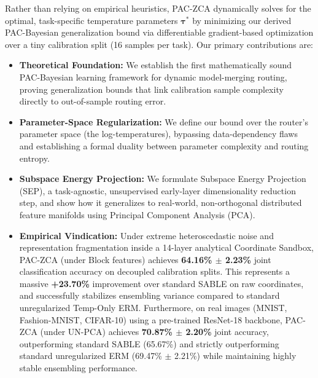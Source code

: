 Rather than relying on empirical heuristics, PAC-ZCA dynamically solves for the optimal, task-specific temperature parameters $\boldsymbol{\tau}^*$ by minimizing our derived PAC-Bayesian generalization bound via differentiable gradient-based optimization over a tiny calibration split (16 samples per task). Our primary contributions are:
\begin{itemize}
    \item \textbf{Theoretical Foundation:} We establish the first mathematically sound PAC-Bayesian learning framework for dynamic model-merging routing, proving generalization bounds that link calibration sample complexity directly to out-of-sample routing error.
    \item \textbf{Parameter-Space Regularization:} We define our bound over the router's parameter space (the log-temperatures), bypassing data-dependency flaws and establishing a formal duality between parameter complexity and routing entropy.
    \item \textbf{Subspace Energy Projection:} We formulate Subspace Energy Projection (SEP), a task-agnostic, unsupervised early-layer dimensionality reduction step, and show how it generalizes to real-world, non-orthogonal distributed feature manifolds using Principal Component Analysis (PCA).
    \item \textbf{Empirical Vindication:} Under extreme heteroscedastic noise and representation fragmentation inside a 14-layer analytical Coordinate Sandbox, PAC-ZCA (under Block features) achieves \textbf{64.16\% $\pm$ 2.23\%} joint classification accuracy on decoupled calibration splits. This represents a massive \textbf{+23.70\%} improvement over standard SABLE on raw coordinates, and successfully stabilizes ensembling variance compared to standard unregularized Temp-Only ERM. Furthermore, on real images (MNIST, Fashion-MNIST, CIFAR-10) using a pre-trained ResNet-18 backbone, PAC-ZCA (under UN-PCA) achieves \textbf{70.87\% $\pm$ 2.20\%} joint accuracy, outperforming standard SABLE (65.67\%) and strictly outperforming standard unregularized ERM (69.47\% $\pm$ 2.21\%) while maintaining highly stable ensembling performance.
\end{itemize}
